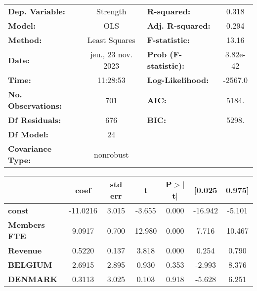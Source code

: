 \documentclass[ 11pt]{article}
\begin{document}
\newpage
\begin{center}
\begin{tabular}{lclc}
\toprule
\textbf{Dep. Variable:}        &      Strength      & \textbf{  R-squared:         } &     0.318   \\
\textbf{Model:}                &        OLS         & \textbf{  Adj. R-squared:    } &     0.294   \\
\textbf{Method:}               &   Least Squares    & \textbf{  F-statistic:       } &     13.16   \\
\textbf{Date:}                 & jeu., 23 nov. 2023 & \textbf{  Prob (F-statistic):} &  3.82e-42   \\
\textbf{Time:}                 &      11:28:53      & \textbf{  Log-Likelihood:    } &   -2567.0   \\
\textbf{No. Observations:}     &          701       & \textbf{  AIC:               } &     5184.   \\
\textbf{Df Residuals:}         &          676       & \textbf{  BIC:               } &     5298.   \\
\textbf{Df Model:}             &           24       & \textbf{                     } &             \\
\textbf{Covariance Type:}      &     nonrobust      & \textbf{                     } &             \\
\bottomrule
\end{tabular}
\begin{tabular}{lcccccc}
                               & \textbf{coef} & \textbf{std err} & \textbf{t} & \textbf{P$> |$t$|$} & \textbf{[0.025} & \textbf{0.975]}  \\
\midrule
\textbf{const}                 &     -11.0216  &        3.015     &    -3.655  &         0.000        &      -16.942    &       -5.101     \\
\textbf{Members FTE}           &       9.0917  &        0.700     &    12.980  &         0.000        &        7.716    &       10.467     \\
\textbf{Revenue}               &       0.5220  &        0.137     &     3.818  &         0.000        &        0.254    &        0.790     \\
\textbf{BELGIUM}               &       2.6915  &        2.895     &     0.930  &         0.353        &       -2.993    &        8.376     \\
\textbf{DENMARK}               &       0.3113  &        3.025     &     0.103  &         0.918        &       -5.628    &        6.251     \\

\end{tabular}
\end{center}
\end{document}
